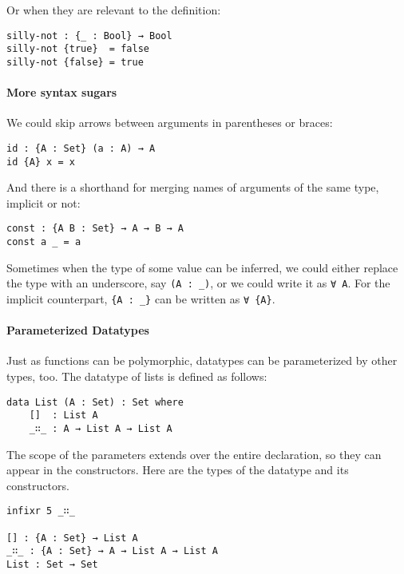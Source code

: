 \documentclass[12pt, a4paper]{article}
\begin{document}
Or when they are relevant to the definition:

\begin{lstlisting}
silly-not : {_ : Bool} → Bool
silly-not {true}  = false
silly-not {false} = true
\end{lstlisting}

\paragraph{More syntax sugars}
We could skip arrows between arguments in parentheses or braces:

\begin{lstlisting}
id : {A : Set} (a : A) → A
id {A} x = x
\end{lstlisting}

And there is a shorthand for merging names of arguments of the same type, implicit or not:

\begin{lstlisting}
const : {A B : Set} → A → B → A
const a _ = a
\end{lstlisting}

Sometimes when the type of some value can be inferred, we could either replace
the type with an underscore, say {\lstinline|(A : _)|}, or we could write it as
{\lstinline|∀ A|}. For the implicit counterpart, {\lstinline|{A : _}|} can be
written as {\lstinline|∀ {A}|}.

\paragraph{Parameterized Datatypes}

Just as functions can be polymorphic, datatypes can be parameterized by other
types, too. The datatype of lists is defined as follows:

\begin{lstlisting}
data List (A : Set) : Set where
    []  : List A
    _∷_ : A → List A → List A
\end{lstlisting}

The scope of the parameters extends over the entire declaration, so they can
appear in the constructors.
Here are the types of the datatype and its constructors.

\begin{lstlisting}
infixr 5 _∷_

[] : {A : Set} → List A
_∷_ : {A : Set} → A → List A → List A
List : Set → Set
\end{lstlisting}
\end{document}
